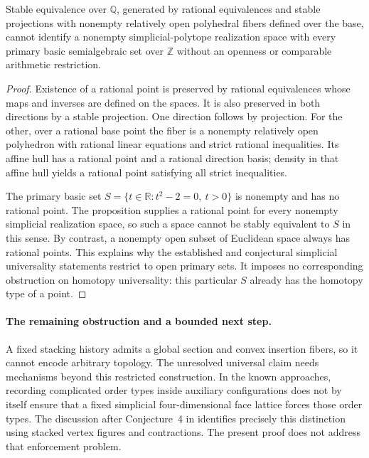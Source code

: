 \begin{corollary}
Stable equivalence over \(\mathbb Q\), generated by rational equivalences
and stable projections with nonempty relatively open polyhedral fibers
defined over the base, cannot identify a nonempty simplicial-polytope
realization space with every primary basic semialgebraic set over
\(\mathbb Z\) without an openness or comparable arithmetic restriction.
\end{corollary}
\begin{proof}
Existence of a rational point is preserved by rational equivalences
whose maps and inverses are defined on the spaces. It is also preserved
in both directions by a stable projection. One direction follows by
projection. For the other, over a rational base point the fiber is a
nonempty relatively open polyhedron with rational linear equations and
strict rational inequalities. Its affine hull has a rational point and
a rational direction basis; density in that affine hull yields a rational
point satisfying all strict inequalities.

The primary basic set
\(S=\{t\in\mathbb R:t^2-2=0,\ t>0\}\) is nonempty and has no rational
point. The proposition supplies a rational point for every nonempty
simplicial realization space, so such a space cannot be stably equivalent
to \(S\) in this sense. By contrast, a nonempty open subset of Euclidean
space always has rational points. This explains why the established and
conjectural simplicial universality statements restrict to open primary
sets. It imposes no corresponding obstruction on homotopy universality:
this particular \(S\) already has the homotopy type of a point.
\end{proof}

\paragraph{The remaining obstruction and a bounded next step.}
A fixed stacking history admits a global section and convex insertion
fibers, so it cannot encode arbitrary topology. The unresolved universal
claim needs mechanisms beyond this restricted construction. In the
known approaches, recording complicated order types inside auxiliary
configurations does not by itself ensure that a fixed simplicial
four-dimensional face lattice forces those order types. The discussion
after Conjecture~4 in \citet{adiprasitopadrol2017universality} identifies
precisely this distinction using stacked vertex figures and contractions.
The present proof does not address that enforcement problem.

